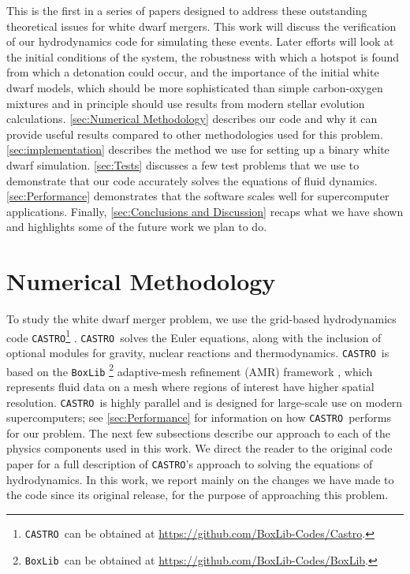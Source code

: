 \documentclass[iop]{../emulateapj}
\newcommand{\boxlib}{\texttt{BoxLib}}
\newcommand{\castro}{\texttt{CASTRO}}
\begin{document}
This is the first in a series of papers designed to address these
outstanding theoretical issues for white dwarf mergers. This work will
discuss the verification of our hydrodynamics code for simulating
these events. Later efforts will look at the initial conditions of the
system, the robustness with which a hotspot is found from which a
detonation could occur, and the importance of the initial white dwarf
models, which should be more sophisticated than simple carbon-oxygen
mixtures and in principle should use results from modern stellar
evolution calculations. \autoref{sec:Numerical Methodology}
describes our code and why it can provide useful results compared to
other methodologies used for this problem. 
\autoref{sec:implementation} describes the method we use for setting up a
binary white dwarf simulation. \autoref{sec:Tests} discusses a few
test problems that we use to demonstrate that our code accurately
solves the equations of fluid dynamics. \autoref{sec:Performance}
demonstrates that the software scales well for supercomputer
applications. Finally, \autoref{sec:Conclusions and Discussion}
recaps what we have shown and highlights some of the future work we
plan to do.

\section{Numerical Methodology}\label{sec:Numerical Methodology}

To study the white dwarf merger problem, we use the grid-based
hydrodynamics code \castro\footnote{\castro\ can be obtained at \url{https://github.com/BoxLib-Codes/Castro}.} \citep{castro}.
\castro\ solves the Euler
equations, along with the inclusion of optional modules for gravity,
nuclear reactions and thermodynamics. \castro\ is based on the \boxlib
\footnote{\boxlib\ can be obtained at \url{https://github.com/BoxLib-Codes/BoxLib}.}
adaptive-mesh refinement (AMR) framework \citep{rendleman:2000}, which
represents fluid data on a mesh where regions of interest have higher
spatial resolution. \castro\ is highly parallel and is designed for
large-scale use on modern supercomputers; see 
\autoref{sec:Performance} for information on how \castro\ performs for our
problem. The next few subsections describe our approach to each of the
physics components used in this work. We direct the reader to the
original code paper for a full description of \castro's approach to
solving the equations of hydrodynamics. In this work, we report mainly
on the changes we have made to the code since its original release,
for the purpose of approaching this problem.
\end{document}
